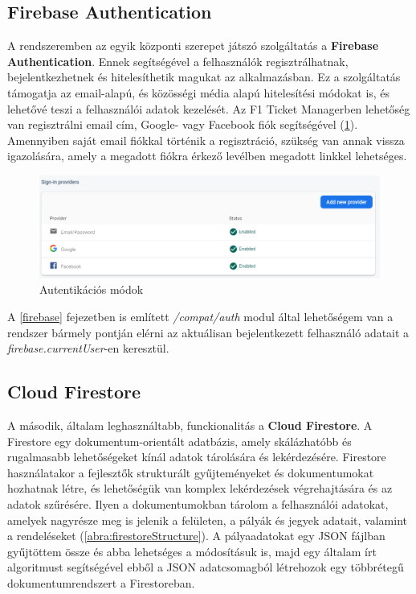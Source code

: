 \subsection {Firebase Authentication}

A rendszeremben az egyik központi szerepet játszó szolgáltatás a \textbf{Firebase Authentication}. Ennek segítségével a felhasználók regisztrálhatnak, bejelentkezhetnek és hitelesíthetik magukat az alkalmazásban. Ez a szolgáltatás támogatja az email-alapú, és közösségi média alapú hitelesítési módokat is, és lehetővé teszi a felhasználói adatok kezelését. Az F1 Ticket Managerben lehetőség van regisztrálni email cím, Google- vagy Facebook fiók segítségével (\ref{abra:loginMethods}). Amennyiben saját email fiókkal történik a regisztráció, szükség van annak vissza igazolására, amely a megadott fiókra érkező levélben megadott linkkel lehetséges.

\begin{figure}[!h]
	\centering
	\includegraphics[scale=0.4]{images/loginMethods}
	\caption{Autentikációs módok}
	\label{abra:loginMethods}
\end{figure}

A \ref{firebase} fejezetben is említett \textit{/compat/auth} modul által lehetőségem van a rendszer bármely pontján elérni az aktuálisan bejelentkezett felhasználó adatait a \textit{firebase.currentUser}-en keresztül.

\subsection {Cloud Firestore}

A második, általam leghasználtabb, funckionalitás a \textbf{Cloud Firestore}. A Firestore egy dokumentum-orientált adatbázis, amely skálázhatóbb és rugalmasabb lehetőségeket kínál adatok tárolására és lekérdezésére. Firestore használatakor a fejlesztők strukturált gyűjteményeket és dokumentumokat hozhatnak létre, és lehetőségük van komplex lekérdezések végrehajtására és az adatok szűrésére. Ilyen a dokumentumokban tárolom a felhasználói adatokat, amelyek nagyrésze meg is jelenik a felületen, a pályák és jegyek adatait, valamint a rendeléseket (\ref{abra:firestoreStructure}). A pályaadatokat egy JSON fájlban gyűjtöttem össze és abba lehetséges a módosításuk is, majd egy általam írt algoritmust segítségével ebből a JSON adatcsomagból létrehozok egy többrétegű dokumentumrendszert a Firestoreban.


